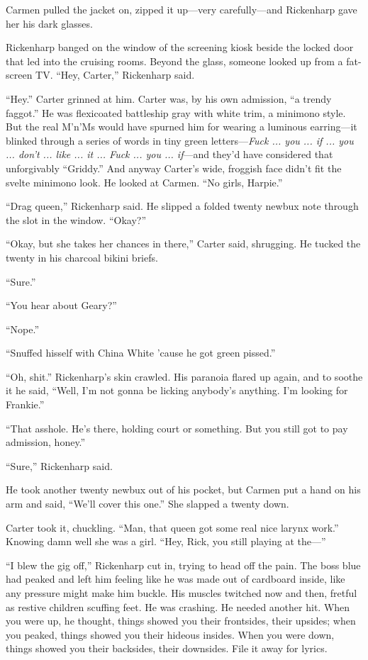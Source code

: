 Carmen pulled the jacket on, zipped it up---very carefully---and Rickenharp gave her his dark glasses.

Rickenharp banged on the window of the screening kiosk beside the locked door that led into the cruising rooms. Beyond the glass, someone looked up from a fat-screen TV. ``Hey, Carter,'' Rickenharp said.

``Hey.'' Carter grinned at him. Carter was, by his own admission, ``a trendy faggot.'' He was flexicoated battleship gray with white trim, a minimono style. But the real M'n'Ms would have spurned him for wearing a luminous earring---it blinked through a series of words in tiny green letters---\textit{Fuck ... you ... if ... you ... don't ... like ... it ... Fuck ... you ... if}---and they'd have considered that unforgivably ``Griddy.'' And anyway Carter's wide, froggish face didn't fit the svelte minimono look. He looked at Carmen. ``No girls, Harpie.''

``Drag queen,'' Rickenharp said. He slipped a folded twenty newbux note through the slot in the window. ``Okay?''

``Okay, but she takes her chances in there,'' Carter said, shrugging. He tucked the twenty in his charcoal bikini briefs.

``Sure.''

``You hear about Geary?''

``Nope.''

``Snuffed hisself with China White 'cause he got green pissed.''

``Oh, shit.'' Rickenharp's skin crawled. His paranoia flared up again, and to soothe it he said, ``Well, I'm not gonna be licking anybody's anything. I'm looking for Frankie.''

``That asshole. He's there, holding court or something. But you still got to pay admission, honey.''

``Sure,'' Rickenharp said.

He took another twenty newbux out of his pocket, but Carmen put a hand on his arm and said, ``We'll cover this one.'' She slapped a twenty down.

Carter took it, chuckling. ``Man, that queen got some real nice larynx work.'' Knowing damn well she was a girl. ``Hey, Rick, you still playing at the---''

``I blew the gig off,'' Rickenharp cut in, trying to head off the pain. The boss blue had peaked and left him feeling like he was made out of cardboard inside, like any pressure might make him buckle. His muscles twitched now and then, fretful as restive children scuffing feet. He was crashing. He needed another hit. When you were up, he thought, things showed you their frontsides, their upsides; when you peaked, things showed you their hideous insides. When you were down, things showed you their backsides, their downsides. File it away for lyrics.

